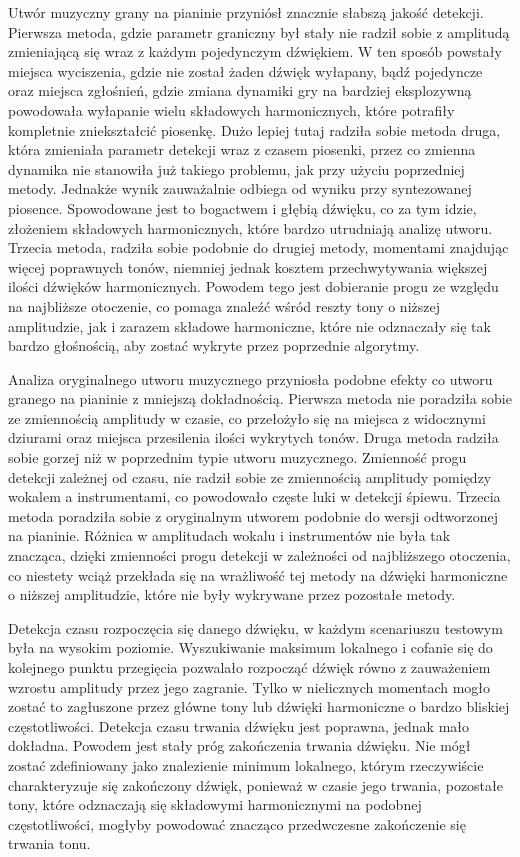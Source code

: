Utwór muzyczny grany na pianinie przyniósł znacznie słabszą jakość detekcji. Pierwsza metoda, gdzie parametr graniczny był stały nie radził sobie z amplitudą zmieniającą się wraz z każdym pojedynczym dźwiękiem. W ten sposób powstały miejsca wyciszenia, gdzie nie został żaden dźwięk wyłapany, bądź pojedyncze oraz miejsca zgłośnień, gdzie zmiana dynamiki gry na bardziej eksplozywną powodowała wyłapanie wielu składowych harmonicznych, które potrafiły kompletnie zniekształcić piosenkę. Dużo lepiej tutaj radziła sobie metoda druga, która zmieniała parametr detekcji wraz z czasem piosenki, przez co zmienna dynamika nie stanowiła już takiego problemu, jak przy użyciu poprzedniej metody. Jednakże wynik zauważalnie odbiega od wyniku przy syntezowanej piosence. Spowodowane jest to bogactwem i głębią dźwięku, co za tym idzie, złożeniem składowych harmonicznych, które bardzo utrudniają analizę utworu. Trzecia metoda, radziła sobie podobnie do drugiej metody, momentami znajdując więcej poprawnych tonów, niemniej jednak kosztem przechwytywania większej ilości dźwięków harmonicznych. Powodem tego jest dobieranie progu ze względu na najbliższe otoczenie, co pomaga znaleźć wśród reszty tony o niższej amplitudzie, jak i zarazem składowe harmoniczne, które nie 
odznaczały się tak bardzo głośnością, aby zostać wykryte przez poprzednie algorytmy.

Analiza oryginalnego utworu muzycznego przyniosła podobne efekty co utworu granego na pianinie z mniejszą dokładnością. Pierwsza metoda nie poradziła sobie ze zmiennością amplitudy w czasie, co przełożyło się na miejsca z widocznymi dziurami oraz miejsca przesilenia ilości wykrytych tonów. Druga metoda radziła sobie gorzej niż w poprzednim typie utworu muzycznego. Zmienność progu detekcji zależnej od czasu, nie radził sobie ze zmiennością amplitudy pomiędzy wokalem a instrumentami, co powodowało częste luki w detekcji śpiewu. Trzecia metoda poradziła sobie z oryginalnym utworem podobnie do wersji odtworzonej na pianinie. Różnica w amplitudach wokalu i instrumentów nie była tak znacząca, dzięki zmienności progu detekcji w zależności od najbliższego otoczenia, co niestety wciąż przekłada się na wrażliwość tej metody na dźwięki harmoniczne o niższej amplitudzie, które nie były wykrywane przez pozostałe metody.

Detekcja czasu rozpoczęcia się danego dźwięku, w każdym scenariuszu testowym była na wysokim poziomie. Wyszukiwanie maksimum lokalnego i cofanie się do kolejnego punktu przegięcia pozwalało rozpocząć dźwięk równo z zauważeniem wzrostu amplitudy przez jego zagranie. Tylko w nielicznych momentach mogło zostać to zagłuszone przez główne tony lub dźwięki harmoniczne o bardzo bliskiej częstotliwości. Detekcja czasu trwania dźwięku jest poprawna, jednak mało dokładna. Powodem jest stały próg zakończenia trwania dźwięku. Nie mógł zostać zdefiniowany jako znalezienie minimum lokalnego, którym rzeczywiście charakteryzuje się zakończony dźwięk, ponieważ w czasie jego trwania, pozostałe tony, które odznaczają się składowymi harmonicznymi na podobnej częstotliwości, mogłyby powodować znacząco przedwczesne zakończenie się trwania tonu.

